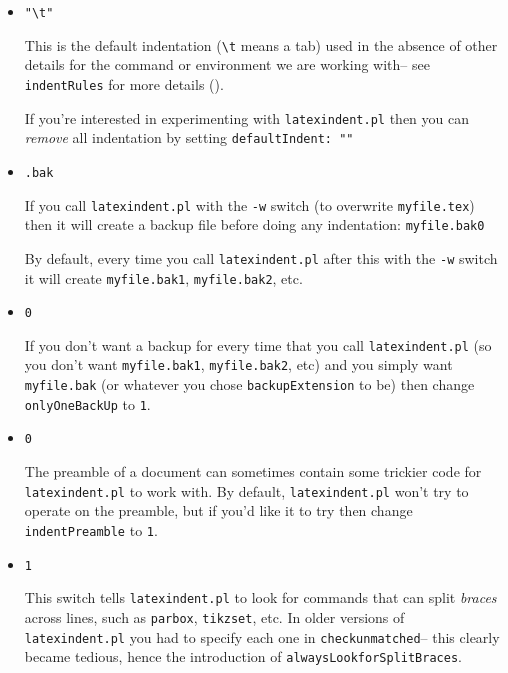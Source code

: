 \begin{itemize}
	\item[\verbitem{defaultIndent}] \lstinline!"\t"!
														 		 		 		 		 					
	This is the default indentation (\lstinline!\t! means a tab) used in the absence of other details 
	for the command or environment we are working with-- see \lstinline!indentRules!
	for more details ().
														 		 		 		 		 					
	If you're interested in experimenting with \lstinline!latexindent.pl! then you 
	can \emph{remove} all indentation by setting \lstinline!defaultIndent: ""!
	\item[\verbitem{backupExtension}] \lstinline!.bak!
														 		 		 		 		 					
	If you call \lstinline!latexindent.pl! with the \lstinline!-w! switch (to overwrite
	\lstinline!myfile.tex!) then it will create a backup file before doing 
	any indentation: \lstinline!myfile.bak0! 
														 		 		 		 		 					
	By default, every time you call \lstinline!latexindent.pl! after this with 
	the \lstinline!-w! switch it will create \lstinline!myfile.bak1!, \lstinline!myfile.bak2!, 
	etc.
	\item[\verbitem{onlyOneBackUp}] \lstinline!0!
														 		 		 		 		 					
	\label{page:onlyonebackup}
	If you don't want a backup for every time that you call \lstinline!latexindent.pl! (so 
	you don't want \lstinline!myfile.bak1!, \lstinline!myfile.bak2!, etc) and you simply
	want \lstinline!myfile.bak! (or whatever you chose \lstinline!backupExtension! to be)
	then change \lstinline!onlyOneBackUp! to \lstinline!1!.
	\item[\verbitem{indentPreamble}] \lstinline!0!
														 		 		 		 		 					
	The preamble of a document can sometimes contain some trickier code 
	for \lstinline!latexindent.pl! to work with. By default, \lstinline!latexindent.pl!
	won't try to operate on the preamble, but if you'd like it to try then 
	change \lstinline!indentPreamble! to \lstinline!1!.
	\item[\verbitem{alwaysLookforSplitBraces}] \lstinline!1!
														 		 		 		 		 					
	This switch tells \lstinline!latexindent.pl! to look for commands that 
	can split \emph{braces} across lines, such as \lstinline!parbox!, \lstinline!tikzset!, etc. In older
	versions of \lstinline!latexindent.pl! you had to specify each one in \lstinline!checkunmatched!-- this 
	clearly became tedious, hence the introduction of \lstinline!alwaysLookforSplitBraces!. 
														 		 		 		 		 					

\end{itemize}

